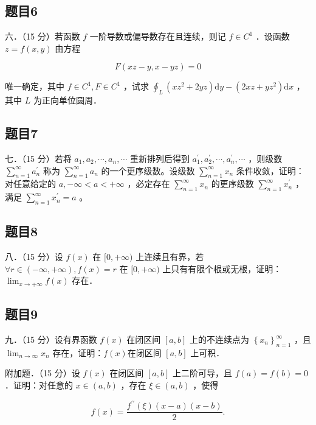 \documentclass{article}
\begin{document}
\subsection{题目6}
六．（15 分）若函数 \(f\) 一阶导数或偏导数存在且连续，则记 \(f \in C^{1}\) ．设函数 \(z=f(x, y)\) 由方程

\[
F(x z-y, x-y z)=0
\]

唯一确定，其中 \(f \in C^{1}, F \in C^{1}\) ，试求 \(\oint_{L}\left(x z^{2}+2 y z\right) \mathrm{d} y-\left(2 x z+y z^{2}\right) \mathrm{d} x\) ，其中 \(L\) 为正向单位圆周．

\subsection{题目7}
七．（15 分）若将 \(a_{1}, a_{2}, \cdots, a_{n}, \cdots\) 重新排列后得到 \(a_{1}^{\prime}, a_{2}^{\prime}, \cdots, a_{n}^{\prime}, \cdots\) ，则级数 \(\sum_{n=1}^{\infty} a_{n}^{\prime}\) 称为 \(\sum_{n=1}^{\infty} a_{n}\) 的一个更序级数。设级数 \(\sum_{n=1}^{\infty} x_{n}\) 条件收敛，证明：对任意给定的 \(a,-\infty<a<+\infty\) ，必定存在 \(\sum_{n=1}^{\infty} x_{n}\) 的更序级数 \(\sum_{n=1}^{\infty} x_{n}^{\prime}\) ，满足 \(\sum_{n=1}^{\infty} x_{n}^{\prime}=a\) 。

\subsection{题目8}
八．（15 分）设 \(f(x)\) 在 \([0,+\infty)\) 上连续且有界，若 \(\forall r \in(-\infty,+\infty), f(x)=r\) 在 \([0,+\infty)\) 上只有有限个根或无根，证明： \(\lim _{x \rightarrow+\infty} f(x)\) 存在．

\subsection{题目9}
九．（15 分）设有界函数 \(f(x)\) 在闭区间 \([a, b]\) 上的不连续点为 \(\left\{x_{n}\right\}_{n=1}^{\infty}\) ，且 \(\lim _{n \rightarrow \infty} x_{n}\) 存在，证明：\(f(x)\)在闭区间 \([a, b]\) 上可积．

附加题．（15 分）设 \(f(x)\) 在闭区间 \([a, b]\) 上二阶可导，且 \(f(a)=f(b)=0\) ．证明：对任意的 \(x \in(a, b)\) ，存在 \(\xi \in(a, b)\) ，使得

\[
f(x)=\frac{f^{\prime \prime}(\xi)(x-a)(x-b)}{2} .
\]
\end{document}
